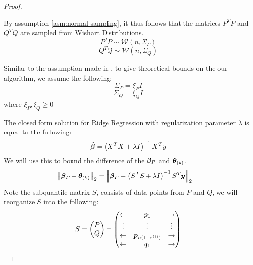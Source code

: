 \documentclass{article} %
\newcommand{\norm}[1]{\left\lVert#1\right\rVert}
\begin{document}
\begin{appendices}
\begin{proof}
		\begin{assumption}\label{asm:wishart}
			By assumption \ref{asm:normal-sampling}, it thus follows that the matrices $P^T P$ and $Q^T Q$ are sampled from Wishart Distributions.
			\begin{equation}
				P^T P \sim \mathcal{W}\left(n,\Sigma_P\right)
			\end{equation}
			\begin{equation}
				Q^T Q \sim \mathcal{W}\left(n, \Sigma_Q\right)
			\end{equation}
		\end{assumption}
		
		\begin{assumption}\label{asm:identity-covariance}
			Similar to the assumption made in \cite{bhatia2017}, to give theoretical bounds on the our algorithm, we assume the following:
			\begin{equation}
				\Sigma_P = \xi_P I
			\end{equation}
			\begin{equation} 
				\Sigma_Q = \xi_Q I
			\end{equation}
			where $\xi_P,\xi_Q \geq 0$ 
		\end{assumption}
		The closed form solution for Ridge Regression with regularization parameter $\lambda$ is equal to the following:
		\begin{equation}
			\hat{{\bm{\beta}}} = \left(X^T X+ \lambda I\right)^{-1}X^T y
		\end{equation}
		We will use this to bound the difference of the ${\bm{\beta}}_P$ and ${\bm{\theta}}_{(k)}$.
		\begin{align*}
			\norm{\vbeta_P - \vtheta_{(k)}}_2 &= \norm{\vbeta_P - \left(S^T S + \lambda I\right)^{-1}S^T \vy}_2 &&\\
		\end{align*}
		Note the subquantile matrix $S$, consists of data points from $P$ and $Q$, we will reorganize $S$ into the following:
		\begin{equation*}
			S = \begin{pmatrix}P \\ Q \end{pmatrix} = 
			\begin{pmatrix}
				\leftarrow & {\bm{p}}_1 & \rightarrow \\
				\vdots & \vdots & \vdots \\
				\leftarrow & {\bm{p}}_{n(1-\varepsilon^{(t)})} & \rightarrow\\
				\leftarrow & {\bm{q}}_1 & \rightarrow \\

\end{pmatrix}
\end{equation*}
\end{proof}
\end{appendices}
\end{document}

